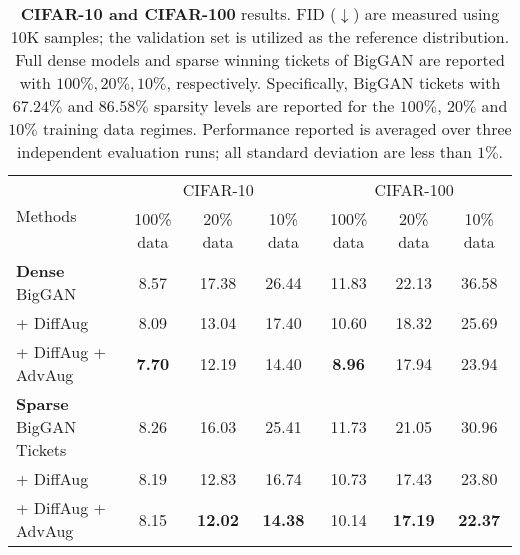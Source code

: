 \documentclass{article}
\begin{document}



\begin{table}[t]
\caption{\small \textbf{CIFAR-10 and CIFAR-100} results. FID ($\downarrow$) are measured using 10K samples; the validation set is utilized as the reference distribution. Full dense models and sparse winning tickets of BigGAN are reported with $100\%,20\%,10\%$, respectively. Specifically, BigGAN tickets with $67.24\%$ and $86.58\%$ sparsity levels are reported for the $100\%$, $20\%$ and $10\%$ training data regimes. Performance reported is averaged over three independent evaluation runs; all standard deviation are less than $1\%$.}
\vspace{-2mm}
\label{tab:cifar}
\centering
\small
\begin{tabular}{l|cccccc}
\toprule
\multirow{2}{*}{Methods} & \multicolumn{3}{c}{CIFAR-10} & \multicolumn{3}{c}{CIFAR-100} \\ \cmidrule(lr){2-4} \cmidrule(lr){5-7}
& 100\% data & 20\% data & 10\% data & 100\% data & 20\% data & 10\% data \\ \midrule
\textbf{Dense} BigGAN  & 8.57 & 17.38 & 26.44 & 11.83 & 22.13 & 36.58 \\
+ DiffAug \cite{zhao2020diffaugment} & 8.09 & 13.04 & 17.40 & 10.60 & 18.32 & 25.69 \\
+ DiffAug + AdvAug & \textbf{7.70} & 12.19 & 14.40 & \textbf{8.96} & 17.94 & 23.94\\ \midrule
\textbf{Sparse} BigGAN Tickets & 8.26 & 16.03 & 25.41 & 11.73 & 21.05 & 30.96 \\
+ DiffAug \cite{zhao2020diffaugment} & 8.19 & 12.83 & 16.74 & 10.73 & 17.43 & 23.80\\
+ DiffAug + AdvAug & 8.15 & \textbf{12.02} & \textbf{14.38} & 10.14 & \textbf{17.19} & \textbf{22.37} \\
\bottomrule
\end{tabular}
\vspace{-2mm}
\end{table}
\end{document}
